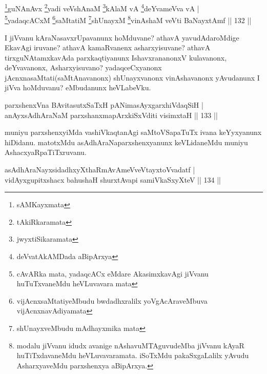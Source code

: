 \begin{shl}
\footnote{sAMKayxmata}guNAnAvx \footnote{tAkiRkaramata}yadi veVshAnaM \footnote{jwyxtiSikaramata}kAlaM vA \footnote{deVvatAkAMDada aBipArxya}deYvameVva vA |\\
\footnote{cAvARka mata, yadaqcACx eMdare AkasimxkavAgi jiVvanu huTuTxvaneMdu heVLuvavara mata}yadaqcACxM \footnote{vijAcnxsaMtatiyeMbudu bwdadhxralilx yoVgAcAraveMbuva vijAcnxnavAdiyamata}saMtatiM \footnote{shUnayxveMbudu mAdhayxmika mata}shUnayxM \footnote{modalu jiVvanu idudx avanige nAshavuMTAguvudeMba jiVvanu kAyaR huTiTxdavaneMdu heVLuvavaramata. iSoTxMdu pakaSxgaLalilx yAvudu AsharxyaveMdu parxshenxya aBipArxya.}vinAshaM veVti BaNayxtAmf \hfill || 132 ||
\end{shl}

\begin{artha}
I jiVvanu kAraNasavxrUpavanunx hoMduvane? athavA yavudAdaroMdige EkavAgi iruvane? athavA kamaRvanenx asharxyisuvane? athavA tirxguNAtamxkavAda parxkaqtiyanunx IshavxrananonxV kulavanonx, deYvavanonx, Asharxyisuvano? yadaqceCxyanonx jAcnxnasaMtati(saMtAnavanonx) shUnayxvanonx vinAshavanonx yAvudanunx I jiVva hoMduvanu? eMbudanunx heVLabeVku.
\end{artha}


\begin{shl}
parxshenxVna BAvitasutxSaTxH pANimasAyxgarxhiVdaqSiH |\\
anAyxsAdhAraNaM parxshanxmapArxkiSxVditi visimxtaH \hfill || 133 ||
\end{shl}

\begin{artha}
muniyu parxshenxyiMda vashiVkaqtanAgi saMtoVSapaTuTx ivana keYyxyanunx hiDidanu. matotxMdu asAdhAraNaparxshenxyanunx keVLidaneMdu muniyu AshacxyaRpaTiTxruvanu.
\end{artha}

\begin{shl}
asAdhAraNayxsidadhxyXthaRmAvAmeVveVtayxtoV\s vadatf |\\
vidAyxgupitxshacx bahushaH shurxtAvapi samiVkaSxyXteV \hfill || 134 ||
\end{shl}

